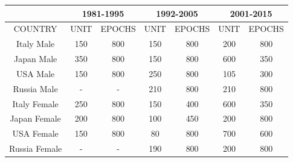 \documentclass[a4,11pt]{article}
\begin{document}
 



\begin{table}[H]
\begin{tabular}{|c|c|c|c|c|c|c|}
\hline
\textbf{}     & \multicolumn{2}{c|}{1981-1995} & \multicolumn{2}{c|}{1992-2005} & \multicolumn{2}{c|}{2001-2015} \\ \hline
COUNTRY       & UNIT          & EPOCHS         & UNIT          & EPOCHS         & UNIT          & EPOCHS         \\ \hline
Italy Male    & 150           & 800            & 150           & 800            & 200           & 800            \\ \hline
Japan Male    & 350           & 800            & 150           & 800            & 600           & 350            \\ \hline
USA Male      & 150           & 800            & 250           & 800            & 105           & 300            \\ \hline
Russia Male   & -             & -              & 210           & 800            & 210           & 800            \\ \hline
Italy Female  & 250           & 800            & 150           & 400            & 600           & 350            \\ \hline
Japan Female  & 200           & 800            & 100           & 450            & 200           & 800            \\ \hline
USA Female    & 150           & 800            & 80            & 800            & 700           & 600            \\ \hline
Russia Female & -             & -              & 190           & 800            & 200           & 800            \\ \hline
\end{tabular}
\end{table}
\end{document}
